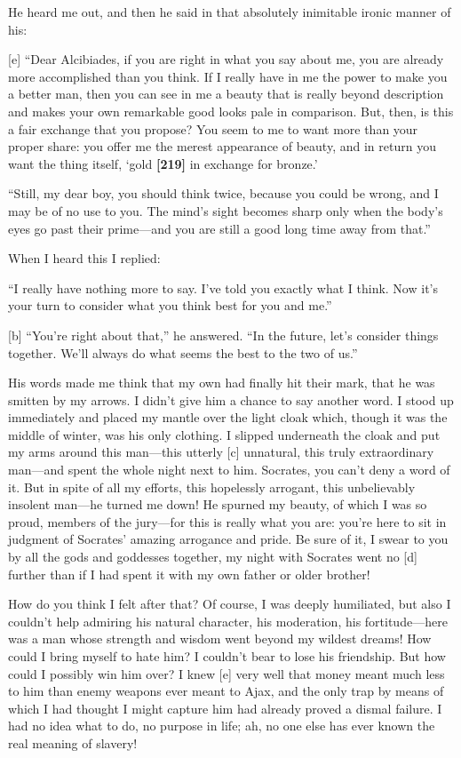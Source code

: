 He heard me out, and then he said in that absolutely inimitable ironic
manner of his:

{[}e{]} “Dear Alcibiades, if you are right in what you say about me, you
are already more accomplished than you think. If I really have in me the
power to make you a better man, then you can see in me a beauty that is
really beyond description and makes your own remarkable good looks pale
in comparison. But, then, is this a fair exchange that you propose? You
seem to me to want more than your proper share: you offer me the merest
appearance of beauty, and in return you want the thing itself, ‘gold
{\bf {[}219{]}} in exchange for
bronze.'

“Still, my dear boy, you should think twice, because you could be wrong,
and I may be of no use to you. The mind's sight becomes sharp only when
the body's eyes go past their prime---and you are still a good long time
away from that.”

When I heard this I replied:

“I really have nothing more to say. I've told you exactly what I think.
Now it's your turn to consider what you think best for you and me.”

{[}b{]} “You're right about that,” he answered. “In the future, let's
consider things together. We'll always do what seems the best to the two
of us.”

His words made me think that my own had finally hit their mark, that he
was smitten by my arrows. I didn't give him a chance to say another
word. I stood up immediately and placed my mantle over the light cloak
which, though it was the middle of winter, was his only clothing. I
slipped underneath the cloak and put my arms around this man---this
utterly {[}c{]} unnatural, this truly extraordinary man---and spent the
whole night next to him. Socrates, you can't deny a word of it. But in
spite of all my efforts, this hopelessly arrogant, this unbelievably
insolent man---he turned me down! He spurned my beauty, of which I was
so proud, members of the jury---for this is really what you are: you're
here to sit in judgment of Socrates' amazing arrogance and pride. Be
sure of it, I swear to you by all the gods and goddesses together, my
night with Socrates went no {[}d{]} further than if I had spent it with
my own father or older brother!

How do you think I felt after that? Of course, I was deeply humiliated,
but also I couldn't help admiring his natural character, his moderation,
his fortitude---here was a man whose strength and wisdom went beyond my
wildest dreams! How could I bring myself to hate him? I couldn't bear to
lose his friendship. But how could I possibly win him over? I knew
{[}e{]} very well that money meant much less to him than enemy weapons
ever meant to Ajax,
and the only trap by means of which I had thought I might capture him
had already proved a dismal failure. I had no idea what to do, no
purpose in life; ah, no one else has ever known the real meaning of
slavery!

